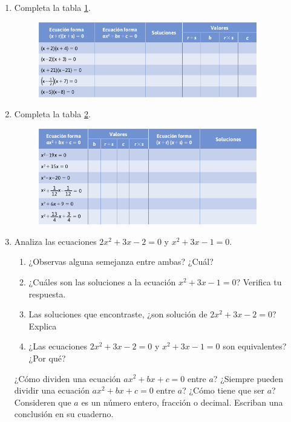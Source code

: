 \documentclass[11pt]{book}
\begin{document}
\begin{enumerate}
    \item Completa la tabla \ref{tab:table2.7}.

          \begin{figure}[H]
              \centering
              \includegraphics[width=0.9\textwidth]{table2.7.png}
              \label{tab:table2.7}
          \end{figure}

    \item Completa la tabla \ref{tab:table2.8}.

          \begin{figure}[H]
              \centering
              \includegraphics[width=0.9\textwidth]{table2.8.png}
              \label{tab:table2.8}
          \end{figure}

    \item Analiza las ecuaciones $2x^2 + 3x - 2 = 0$ y $x^2 + 3 x - 1 = 0$.
          \begin{enumerate}
              \item ¿Observas alguna semejanza entre ambas? ¿Cuál?
              \item ¿Cuáles son las soluciones a la ecuación $x^2 + 3 x - 1 = 0$? Verifica tu respuesta.
              \item Las soluciones que encontraste, ¿son solución de $2x^2 + 3x - 2 = 0$? Explica
              \item ¿Las ecuaciones $2x^2 + 3x - 2 = 0$ y $x^2 + 3 x - 1 = 0$ son equivalentes? ¿Por qué?
          \end{enumerate}
          ¿Cómo dividen una ecuación $ax^2 + bx + c = 0$ entre $a$? ¿Siempre pueden dividir una ecuación
          $ax^2 + bx + c = 0$ entre $a$? ¿Cómo tiene que ser $a$? Consideren que $a$ es un número
          entero, fracción o decimal. Escriban una conclusión en su cuaderno.


\end{enumerate}
\end{document}
